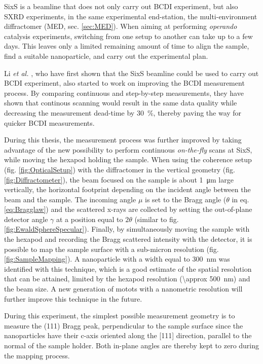 SixS is a beamline that does not only carry out BCDI experiment, but also SXRD experiments, in the same experimental end-station, the multi-environment diffractomer (MED, sec. \ref{sec:MED}).
When aiming at performing \textit{operando} catalysis experiments, switching from one setup to another can take up to a few days.
This leaves only a limited remaining amount of time to align the sample, find a suitable nanoparticle, and carry out the experimental plan.

Li \textit{et al.} \parencite*{Li2020}, who have first shown that the SixS beamline could be used to carry out BCDI experiment, also started to work on improving the BCDI measurement process.
By comparing continuous and step-by-step measurements, they have shown that continous scanning would result in the same data quality while decreasing the measurement dead-time by \qty{30}{\percent}, thereby paving the way for quicker BCDI measurements.

During this thesis, the measurement process was further improved by taking advantage of the new possibility to perform continuous \textit{on-the-fly} scans at SixS, while moving the hexapod holding the sample.
When using the coherence setup (fig. \ref{fig:OpticalSetup}) with the diffractomer in the vertical geometry (fig. \ref{fig:Diffractometer}), the beam focused on the sample is about \qty{1}{\um} large vertically, the horizontal footprint depending on the incident angle between the beam and the sample.
The incoming angle $\mu$ is set to the Bragg angle ($\theta$ in eq. \ref{eq:Bragglaw}) and the scattered x-rays are collected by setting the out-of-plane detector angle $\gamma$ at a position equal to $2\theta$ (similar to fig. \ref{fig:EwaldSphereSpecular}).
Finally, by simultaneously moving the sample with the hexapod and recording the Bragg scattered intensity with the detector, it is possible to map the sample surface with a sub-micron resolution (fig. \ref{fig:SampleMapping}).
A nanoparticle with a width equal to \qty{300}{\nm} was identified with this technique, which is a good estimate of the spatial resolution that can be attained, limited by the hexapod resolution (\qty{\approx 500}{\nm}) and the beam size.
A new generation of motots with a nanometric resolution will further improve this technique in the future.

During this experiment, the simplest possible measurement geometry is to measure the (111) Bragg peak, perpendicular to the sample surface since the nanoparticles have their c-axis oriented along the [111] direction, parallel to the normal of the sample holder.
Both in-plane angles are thereby kept to zero during the mapping process.

